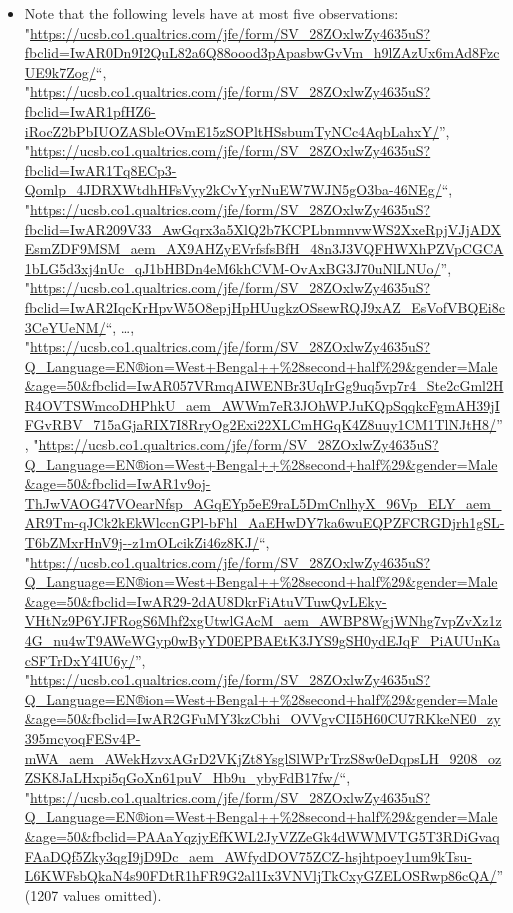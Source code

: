 \documentclass[
]{report}
\providecommand{\tightlist}{%
  \setlength{\itemsep}{0pt}\setlength{\parskip}{0pt}}
\begin{document}
\begin{itemize}
\tightlist
\item
  Note that the following levels have at most five observations:
  "\url{https://ucsb.co1.qualtrics.com/jfe/form/SV_28ZOxlwZy4635uS?fbclid=IwAR0Dn9I2QuL82a6Q88oood3pApasbwGvVm_h9lZAzUx6mAd8FzcUE9k7Zog/}``,
  "\url{https://ucsb.co1.qualtrics.com/jfe/form/SV_28ZOxlwZy4635uS?fbclid=IwAR1pfHZ6-iRocZ2bPbIUOZASbleOVmE15zSOPltHSsbumTyNCc4AqbLahxY/}'',
  "\url{https://ucsb.co1.qualtrics.com/jfe/form/SV_28ZOxlwZy4635uS?fbclid=IwAR1Tq8ECp3-Qomlp_4JDRXWtdhHFsVyy2kCvYyrNuEW7WJN5gO3ba-46NEg/}``,
  "\url{https://ucsb.co1.qualtrics.com/jfe/form/SV_28ZOxlwZy4635uS?fbclid=IwAR209V33_AwGqrx3a5XlQ2b7KCPLbnmnvwWS2XxeRpjVJjADXEsmZDF9MSM_aem_AX9AHZyEVrfsfsBfH_48n3J3VQFHWXhPZVpCGCA1bLG5d3xj4nUc_qJ1bHBDn4eM6khCVM-OvAxBG3J70uNlLNUo/}'',
  "\url{https://ucsb.co1.qualtrics.com/jfe/form/SV_28ZOxlwZy4635uS?fbclid=IwAR2IqcKrHpvW5O8epjHpHUugkzOSsewRQJ9xAZ_EsVofVBQEi8c3CeYUeNM/}``,
  \ldots,
  "\url{https://ucsb.co1.qualtrics.com/jfe/form/SV_28ZOxlwZy4635uS?Q_Language=EN®ion=West+Bengal++\%28second+half\%29\&gender=Male\&age=50\&fbclid=IwAR057VRmqAIWENBr3UqIrGg9uq5vp7r4_Ste2cGml2HR4OVTSWmcoDHPhkU_aem_AWWm7eR3JOhWPJuKQpSqqkcFgmAH39jIFGvRBV_715aGjaRIX7I8RryOg2Exi22XLCmHGqK4Z8uuy1CM1TlNJtH8/}'',
  "\url{https://ucsb.co1.qualtrics.com/jfe/form/SV_28ZOxlwZy4635uS?Q_Language=EN®ion=West+Bengal++\%28second+half\%29\&gender=Male\&age=50\&fbclid=IwAR1v9oj-ThJwVAOG47VOearNfsp_AGqEYp5eE9raL5DmCnlhyX_96Vp_ELY_aem_AR9Tm-qJCk2kEkWlccnGPl-bFhl_AaEHwDY7ka6wuEQPZFCRGDjrh1gSL-T6bZMxrHnV9j--z1mOLcikZi46z8KJ/}``,
  "\url{https://ucsb.co1.qualtrics.com/jfe/form/SV_28ZOxlwZy4635uS?Q_Language=EN®ion=West+Bengal++\%28second+half\%29\&gender=Male\&age=50\&fbclid=IwAR29-2dAU8DkrFiAtuVTuwQvLEky-VHtNz9P6YJFRogS6Mhf2xgUtwlGAcM_aem_AWBP8WgjWNhg7vpZvXz1z4G_nu4wT9AWeWGyp0wByYD0EPBAEtK3JYS9gSH0ydEJqF_PiAUUnKacSFTrDxY4IU6y/}'',
  "\url{https://ucsb.co1.qualtrics.com/jfe/form/SV_28ZOxlwZy4635uS?Q_Language=EN®ion=West+Bengal++\%28second+half\%29\&gender=Male\&age=50\&fbclid=IwAR2GFuMY3kzCbhi_OVVgvCII5H60CU7RKkeNE0_zy395mcyoqFESv4P-mWA_aem_AWekHzvxAGrD2VKjZt8YsglSlWPrTrzS8w0eDqpsLH_9208_ozZSK8JaLHxpi5qGoXn61puV_Hb9u_ybyFdB17fw/}``,
  "\url{https://ucsb.co1.qualtrics.com/jfe/form/SV_28ZOxlwZy4635uS?Q_Language=EN®ion=West+Bengal++\%28second+half\%29\&gender=Male\&age=50\&fbclid=PAAaYqzjyEfKWL2JyVZZeGk4dWWMVTG5T3RDiGvaqFAaDQf5Zky3qgI9jD9Dc_aem_AWfydDOV75ZCZ-hsjhtpoey1um9kTsu-L6KWFsbQkaN4s90FDtR1hFR9G2al1Ix3VNVljTkCxyGZELOSRwp86cQA/}''
  (1207 values omitted).
\end{itemize}
\end{document}
